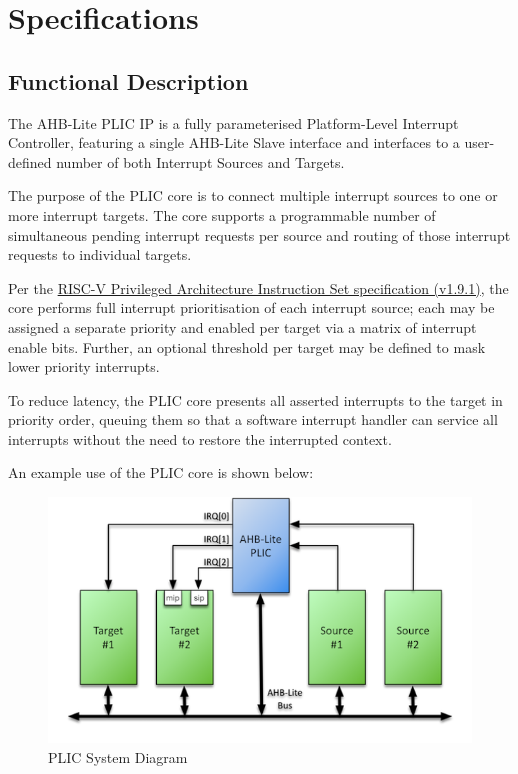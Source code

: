 \section{Specifications}

\subsection{Functional Description}

The AHB-Lite PLIC IP is a fully parameterised Platform-Level Interrupt
Controller, featuring a single AHB-Lite Slave interface and interfaces
to a user-defined number of both Interrupt Sources and Targets.

The purpose of the PLIC core is to connect multiple interrupt sources to
one or more interrupt targets. The core supports a programmable number
of simultaneous pending interrupt requests per source and routing of
those interrupt requests to individual targets.

Per the
\href{https://people.eecs.berkeley.edu/%7Ekrste/papers/riscv-privileged-v1.9.1.pdf}{RISC-V
Privileged Architecture Instruction Set specification (v1.9.1)}, the
core performs full interrupt prioritisation of each interrupt source;
each may be assigned a separate priority and enabled per target via a
matrix of interrupt enable bits. Further, an optional threshold per
target may be defined to mask lower priority interrupts.

To reduce latency, the PLIC core presents all asserted interrupts to the
target in priority order, queuing them so that a software interrupt
handler can service all interrupts without the need to restore the
interrupted context.

An example use of the PLIC core is shown below:

\begin{figure}[h]
\centering
\includegraphics{../assets/graphics/AHB-Lite_PLIC_System_Diagram.png}
\caption{PLIC System Diagram}
\end{figure}

